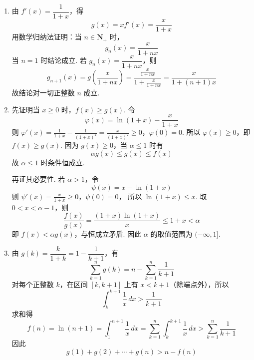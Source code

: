 \begin{solution}
\begin{enumerate}
\item 由 \(f'(x)=\dfrac1{1+x}\)，得
\[
g(x)=xf'(x)=\frac{x}{1+x}
\]
用数学归纳法证明：当 \(n\in\mathbf N_+\) 时，
\[
g_n(x)=\frac{x}{1+nx}
\]
当 \(n=1\) 时结论成立. 若 \(g_n(x)=\dfrac{x}{1+nx}\)，则
\[
g_{n+1}(x)=g\left(\frac{x}{1+nx}\right)
=\frac{\frac{x}{1+nx}}{1+\frac{x}{1+nx}}
=\frac{x}{1+(n+1)x}
\]
故结论对一切正整数 \(n\) 成立.

\item 先证明当 \(x\geqslant0\) 时，\(f(x)\geqslant g(x)\). 令
\[
\varphi(x)=\ln(1+x)-\frac{x}{1+x}
\]
则
\(\varphi'(x)=\frac1{1+x}-\frac1{(1+x)^2}=\frac{x}{(1+x)^2}\geqslant0\)，\(\varphi(0)=0\).
所以 \(\varphi(x)\geqslant0\)，即 \(f(x)\geqslant g(x)\). 因为 \(g(x)\geqslant0\)，当 \(\alpha\leqslant1\) 时有
\[
\alpha g(x)\leqslant g(x)\leqslant f(x)
\]
故 \(\alpha\leqslant1\) 时条件恒成立.

再证其必要性. 若 \(\alpha>1\)，令
\[
\psi(x)=x-\ln(1+x)
\]
则
\(\psi'(x)=\frac{x}{1+x}\geqslant0\)，\(\psi(0)=0\)，
所以 \(\ln(1+x)\leqslant x\). 取 \(0<x<\alpha-1\)，则
\[
\frac{f(x)}{g(x)}
=\frac{(1+x)\ln(1+x)}{x}
\leqslant1+x<\alpha
\]
即 \(f(x)<\alpha g(x)\)，与恒成立矛盾. 因此 \(\alpha\) 的取值范围为 \((-\infty,1]\).

\item 由 \(g(k)=\dfrac{k}{1+k}=1-\dfrac1{k+1}\)，有
\[
\sum_{k=1}^{n}g(k)=n-\sum_{k=1}^{n}\frac1{k+1}
\]
对每个正整数 \(k\)，在区间 \([k,k+1]\) 上有 \(x<k+1\)（除端点外），所以
\[
\int_k^{k+1}\frac{1}{x}\,dx>\frac1{k+1}
\]
求和得
\[
f(n)=\ln(n+1)=\int_1^{n+1}\frac{1}{x}\,dx
=\sum_{k=1}^{n}\int_k^{k+1}\frac{1}{x}\,dx
>\sum_{k=1}^{n}\frac1{k+1}
\]
因此
\[
g(1)+g(2)+\cdots+g(n)>n-f(n)
\]
\end{enumerate}
\end{solution}
